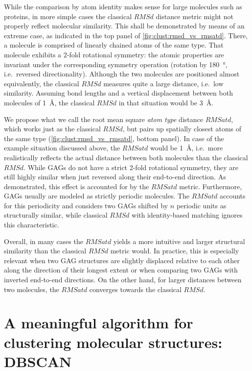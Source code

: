 While the comparison by atom identity makes sense for large molecules such as
proteins, in more simple cases the classical $RMSd$ distance metric might not
properly reflect molecular similarity. This shall be demonstrated by means of an
extreme case, as indicated in the top panel of
\cref{fig:clust:rmsd_vs_rmsatd}. There, a molecule is comprised of linearly
chained atoms of the same type. That molecule exhibits a 2-fold rotational
symmetry: the atomic properties are invariant under the corresponding symmetry
operation (rotation by \SI{180}{\degree}, i.e.\ reversed directionality).
Although the two molecules are positioned almost equivalently, the classical
$RMSd$ measures quite a large distance, i.e.\ low similarity. Assuming bond
lengths and a vertical displacement between both molecules of \SI{1}{\angstrom},
the classical $RMSd$ in that situation would be \SI{3}{\angstrom}.

We propose what we call the root mean square \textit{atom type} distance
$RMSatd$, which works just as the classical $RMSd$, but pairs up spatially
closest atoms of the same type (\cref{fig:clust:rmsd_vs_rmsatd}, bottom panel).
In case of the example situation discussed above, the $RMSatd$ would be
\SI{1}{\angstrom}, i.e.\ more realistically reflects the actual distance between
both molecules than the classical $RMSd$. While GAGs do not have a strict 2-fold
rotational symmetry, they are still highly similar when just reversed along
their end-to-end direction. As demonstrated, this effect is accounted for by the
$RMSatd$ metric. Furthermore, GAGs usually are modeled as strictly periodic
molecules. The $RMSatd$ accounts for this periodicity and considers two GAGs
shifted by $n$ periodic units as structurally similar, while classical $RMSd$
with identity-based matching ignores this characteristic.

Overall, in many cases the $RMSatd$ yields a more intuitive and larger
structural similarity than the classical $RMSd$ metric would. In practice, this
is especially relevant when two GAG structures are slightly displaced relative
to each other along the direction of their longest extent or when comparing two
GAGs with inverted end-to-end directions. On the other hand, for larger
distances between two molecules, the $RMSatd$ converges towards the classical
$RMSd$.


\section{A meaningful algorithm for clustering molecular structures: DBSCAN}

